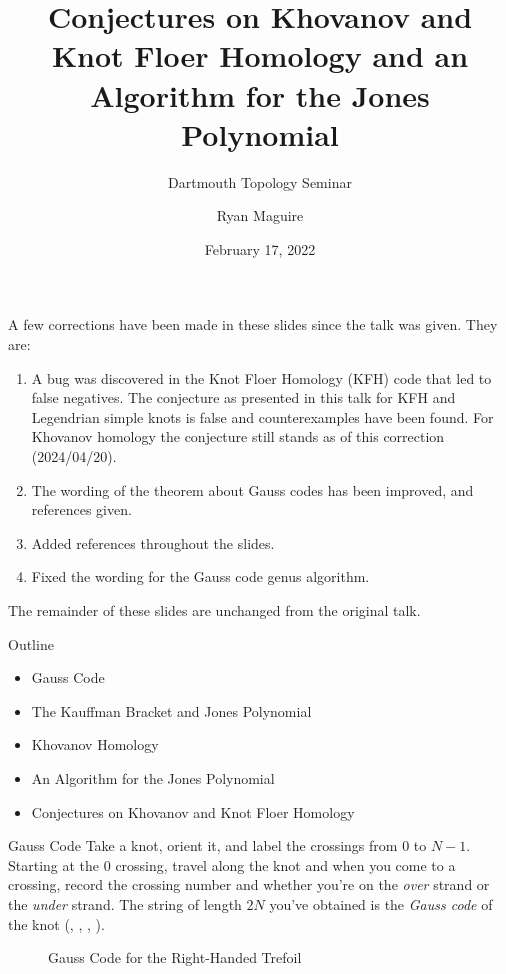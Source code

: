 \documentclass{beamer}
\title{%
    Conjectures on Khovanov and Knot Floer Homology
    and an Algorithm for the Jones Polynomial%
}
\subtitle{Dartmouth Topology Seminar}
\author{Ryan Maguire}
\institute{Dartmouth College}
\date{February 17, 2022}
\begin{document}
    \maketitle
    \begin{frame}{\textbf{\color{red}{Corrections}}}
        A few corrections have been made in these slides since the talk was
        given. They are:
        \begin{enumerate}
            \item
                A bug was discovered in the Knot Floer Homology (KFH) code that
                led to false negatives. The conjecture as presented in this
                talk for KFH and Legendrian simple knots is false and
                counterexamples have been found. For Khovanov homology the
                conjecture still stands as of this correction
                (2024/04/20).
            \item
                The wording of the theorem about Gauss codes has been improved,
                and references given.
            \item Added references throughout the slides.
            \item
                Fixed the wording for the Gauss code genus algorithm.
        \end{enumerate}
        The remainder of these slides are unchanged from the original talk.
    \end{frame}
    \begin{frame}{Outline}
        \begin{itemize}
            \item Gauss Code
            \item The Kauffman Bracket and Jones Polynomial
            \item Khovanov Homology
            \item An Algorithm for the Jones Polynomial
            \item Conjectures on Khovanov and Knot Floer Homology
        \end{itemize}
    \end{frame}
    \begin{frame}{Gauss Code}
        Take a knot, orient it, and label the crossings from 0 to $N-1$.
        Starting at the 0 crossing, travel along the knot and when you come
        to a crossing, record the crossing number and whether you're on the
        \textit{over} strand or the \textit{under} strand. The string of length
        $2N$ you've obtained is the \textit{Gauss code} of the knot
        (\cite{KatlasGaussCode},
        \cite{KnotInfoGaussCode},
        \cite[p.~871]{GibsonHomotopyInvariantsOfGaussWords},
        \cite[p.~507-508]{LisitsaPotapovSalehAutomataOnGaussWords}).
        \begin{figure}
            \centering
            \caption{Gauss Code for the Right-Handed Trefoil}
            \label{fig:right_handed_trefoil_gauss_code}
        \end{figure}
    \end{frame}
\end{document}
